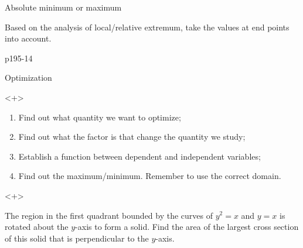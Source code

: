 \begin{frame}{Absolute minimum or maximum}


Based on the analysis of local/relative extremum, take the values
at end points into account.
\begin{example}
p195-14
\end{example}

\end{frame}

\begin{frame}{Optimization}

\begin{onlyenv}<+>

\begin{enumerate}
\item Find out what quantity we want to optimize;
\item Find out what the factor is that change the quantity we study;
\item Establish a function between dependent and independent variables;
\item Find out the maximum/minimum. Remember to use the correct domain.
\end{enumerate}
\end{onlyenv}



\begin{onlyenv}<+>

\begin{example}
The region in the first quadrant bounded by the curves of $y^{2}=x$
and $y=x$ is rotated about the $y$-axis to form a solid. Find the
area of the largest cross section of this solid that is perpendicular
to the $y$-axis.

\begin{center}
\par\end{center}


\end{example}
\end{onlyenv}
\end{frame}
